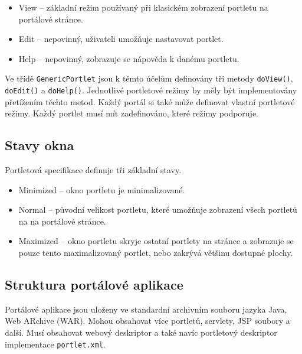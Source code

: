 \documentclass{fithesis}
\begin{document}
\begin{itemize}
\item View -- základní režim používaný při klasickém zobrazení portletu na portálové stránce.
\item Edit -- nepovinný, uživateli umožňuje nastavovat portlet.
\item Help -- nepovinný, zobrazuje se nápověda k danému portletu.
\end{itemize}

Ve třídě \verb|GenericPortlet| jsou k těmto účelům definovány tři metody \verb|doView()|, \verb|doEdit()| a \verb|doHelp()|. Jednotlivé portletové režimy by měly být implementovány přetížením těchto metod. Každý portál si také může definovat vlastní portletové režimy. Každý portlet musí mít zadefinováno, které režimy podporuje.

\subsection*{Stavy okna}
Portletová specifikace definuje tři základní stavy.

\begin{itemize}
\item Minimized -- okno portletu je minimalizované.
\item Normal -- původní velikost portletu, které umožňuje zobrazení všech portletů na na portálové stránce.
\item Maximized -- okno portletu skryje ostatní portlety na stránce a zobrazuje se pouze tento maximalizovaný portlet, nebo zakrývá většinu dostupné plochy.
\end{itemize}

\subsection*{Struktura portálové aplikace}
Portálové aplikace jsou uloženy ve standardní archivním souboru jazyka Java, Web ARchive (WAR). Mohou obsahovat více portletů, servlety, JSP soubory a další. Musí obsahovat webový deskriptor a také navíc portletový deskriptor implementace \verb|portlet.xml|.
\end{document}

